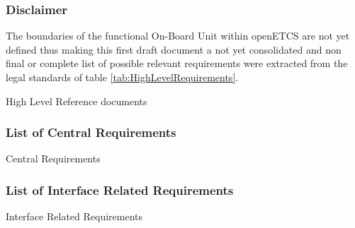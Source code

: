 \subsubsection{Disclaimer} 
The boundaries of the functional On-Board Unit within openETCS are not yet defined thus making this first draft document a not yet consolidated and non final or complete list of possible relevant requirements were extracted from the legal standards of table \ref{tab:HighLevelRequirements}.

\begin{table}[htbp]
	\centering
	\caption{High Level Reference documents}
	\resizebox*{\textwidth}{\textheight}{
		
	}	
  \label{tab:HighLevelRequirements}%
\end{table}%


\subsubsection{List of Central Requirements}

 
\begin{table}[htbp]
	\centering
	\caption{Central Requirements}
	\resizebox*{\textwidth}{\textheight}{
		
	}	
  \label{tab:CentralRequirements}%
\end{table}%


\subsubsection{List of Interface Related Requirements}

 
\begin{table}[htbp]
	\centering
	\caption{Interface Related Requirements}
	\resizebox*{\textwidth}{\textheight}{
		
	}	
  \label{tab:InterfaceRelatedRequirements}%
\end{table}%

